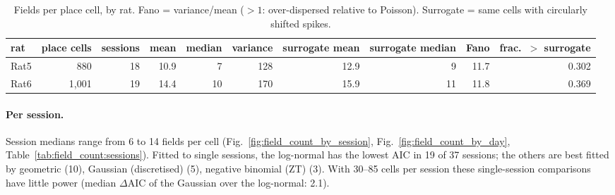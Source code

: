 \begin{table}[htbp]
\centering
\footnotesize
\caption{Fields per place cell, by rat. Fano = variance/mean ($>1$: over-dispersed relative to Poisson). Surrogate = same cells with circularly shifted spikes.}
\label{tab:field_count:summary}
\begin{tabular}{lrrrrrrrrr}
\toprule
rat & place cells & sessions & mean & median & variance & surrogate mean & surrogate median & Fano & frac.\ $>$ surrogate \\
\midrule
Rat5 & 880 & 18 & 10.9 & 7 & 128 & 12.9 & 9 & 11.7 & 0.302 \\
Rat6 & 1{,}001 & 19 & 14.4 & 10 & 170 & 15.9 & 11 & 11.8 & 0.369 \\
\bottomrule
\end{tabular}
\end{table}
\paragraph{Per session.} Session medians range from 6 to 14 fields per cell (Fig.~\ref{fig:field_count_by_session}, Fig.~\ref{fig:field_count_by_day}, Table~\ref{tab:field_count:sessions}). Fitted to single sessions, the log-normal has the lowest AIC in 19 of 37 sessions; the others are best fitted by geometric (10), Gaussian (discretised) (5), negative binomial (ZT) (3). With 30--85 cells per session these single-session comparisons have little power (median $\Delta$AIC of the Gaussian over the log-normal: 2.1).

